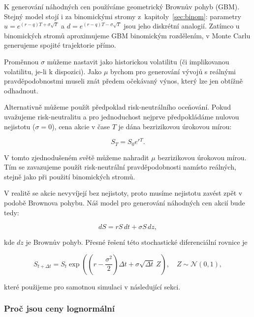 \documentclass{article}
\begin{document}
K generování náhodných cen používáme geometrický Brownův pohyb (GBM). Stejný model stojí i za binomickými stromy z~kapitoly~\ref{sec:binom}: parametry $u = e^{(r - q)T + \sigma\sqrt{T}}$ a $d = e^{(r - q)T - \sigma\sqrt{T}}$ jsou jeho diskrétní analogií. Zatímco u binomických stromů aproximujeme GBM binomickým rozdělením, v Monte Carlu generujeme spojité trajektorie přímo.

\citep[Kapitola~80.2]{Wilmott2006}

Proměnnou $\sigma$ můžeme nastavit jako historickou volatilitu (či implikovanou volatilitu, je-li k dispozici). Jako $\mu$ bychom pro generování vývojů s reálnými pravděpodobnostmi museli znát předem očekávaný výnos, který lze jen obtížně odhadnout.

Alternativně můžeme použít předpoklad risk-neutrálního oceňování.
Pokud uvažujeme risk-neutralitu a pro jednoduchost nejprve předpokládáme nulovou nejistotu ($\sigma = 0$), cena akcie v čase $T$ je dána bezrizikovou úrokovou mírou:

\begin{equation}
  S_T = S_0 e^{rT}.
\end{equation}

V tomto zjednodušeném světě můžeme nahradit $\mu$ bezrizikovou úrokovou mírou. Tím se zavazujeme použít risk-neutrální pravděpodobnosti namísto reálných, stejně jako při použití binomických stromů.

V realitě se akcie nevyvíjejí bez nejistoty, proto musíme nejistotu zavést zpět v podobě Brownova pohybu. Náš model pro generování náhodných cen akcií bude tedy:

\begin{equation}
  dS = r S \, dt + \sigma S \, dz,
\end{equation}

kde $dz$ je Brownův pohyb. Přesné řešení této stochastické diferenciální rovnice je

\begin{equation}
  S_{t + \Delta t} = S_t \exp\!\left( (r - \frac{\sigma^2}{2}) \Delta t + \sigma \sqrt{\Delta t} \, Z \right), \quad Z \sim \mathcal{N}(0,1), \label{eq:exact_gbm}
\end{equation}

které použijeme pro samotnou simulaci v následující sekci.

\citep[Kapitola~1.1]{Glasserman2004}

\subsubsection{Proč jsou ceny lognormální}
\end{document}

